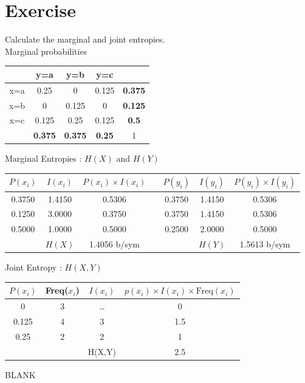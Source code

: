 \documentclass[a4paper,12pt]{article}
\begin{document}
\large
\section*{Exercise}
Calculate the marginal and joint entropies.\\


\noindent Marginal probabilities
\begin{center}
	\begin{tabular}{|c|c|c|c||c|}
		\hline	&	y=a	&	y=b	&	y=c	&		\\ \hline
		x=a	&	0.25	&	0	&	0.125	&	\textbf{0.375}	\\ \hline
		x=b	&	0	&	0.125	&	0	&	\textbf{0.125}	\\ \hline
		x=c	&	0.125	&	0.25	&	0.125	&	\textbf{0.5	}\\ \hline \hline
		&	\textbf{0.375}	&	\textbf{0.375}	&	\textbf{0.25}	&	1	\\ \hline
	\end{tabular}
\end{center}
Marginal Entropies : $H(X)$ and $H(Y)$
\begin{center}
	\begin{tabular}{|c|c|c||c||c|c|c|} \hline
		$P(x_i)$	&	$I(x_i)$	&	$P(x_i) \times I(x_i)$	&&	$P(y_i)$	&	$I(y_i)$	&	$P(y_i) \times I(y_i)$	\\ \hline \hline
		0.3750	&	1.4150	&	0.5306	&&	0.3750	&	1.4150	&	0.5306	\\ \hline
		0.1250	&	3.0000	&	0.3750	&&	0.3750	&	1.4150	&	0.5306	\\ \hline
		0.5000	&	1.0000	&	0.5000	&&	0.2500	&	2.0000	&	0.5000	\\ \hline \hline
		&	$H(X)$	&	1.4056 b/sym	&&		&	$H(Y)$	&	1.5613 b/sym	\\ \hline
	\end{tabular} 
\end{center}
Joint Entropy : $H(X,Y)$
\begin{center}
	\begin{tabular}{|c|c|c|c|}
		\hline
		$P(x_i)$	&	Freq($x_i$)	&	$I(x_i)$	&	$p(x_i)\times I(x_i) \times \mbox{Freq}(x_i)$	\\ \hline
		0	&	3	&	\ldots &	0	\\ \hline
		0.125	&	4	&	3	&	1.5	\\ \hline
		0.25	&	2	&	2	&	1	\\ \hline \hline
		& &H(X,Y) & 2.5 \\ \hline
	\end{tabular} 
\end{center}
\newpage
BLANK
\end{document}
